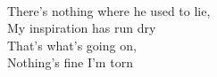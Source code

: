 \\
There's nothing where he used to lie, \\
My inspiration has run dry \\
That's what's going on, \\
Nothing's fine I'm torn
